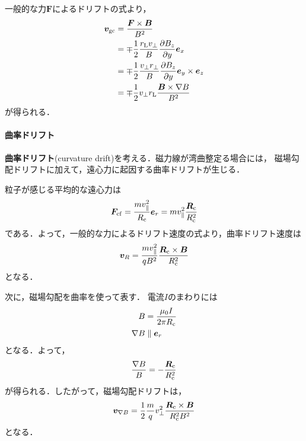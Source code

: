 \documentclass{report}
\begin{document}
          一般的な力$\bm{F}$によるドリフトの式より，
          \begin{align}
            \bm{v}_{\mathrm{gc}} &= \frac{\bm{F}\times\bm{B}}{B^2}\\
            &= \mp \frac{1}{2} \frac{r_{\mathrm{L}}v_{\perp}}{B} \pdv{B_z}{y}\bm{e}_x\\
            &= \mp \frac{1}{2} \frac{v_{\perp} r_{\perp}}{B} \pdv{B_z}{y}\bm{e}_y \times \bm{e}_z\\
            &= \mp \frac{1}{2} v_{\perp} r_{\mathrm{L}} \frac{\bm{B} \times \nabla B}{B^2}
          \end{align}
          が得られる．

        \paragraph{曲率ドリフト}
          \textbf{曲率ドリフト}(curvature drift)を考える．磁力線が湾曲整定る場合には，
          磁場勾配ドリフトに加えて，遠心力に起因する曲率ドリフトが生じる．

          粒子が感じる平均的な遠心力は
          \begin{align}
            \bm{F}_{\mathrm{cf}} = \frac{m v_{\parallel}^2}{R_{\mathrm{c}}}\bm{e}_r = m v_{\parallel}^2 \frac{\bm{R}_{\mathrm{c}}}{R_{\mathrm{c}}^2}
          \end{align}
          である．よって，一般的な力によるドリフト速度の式より，曲率ドリフト速度は
          \begin{align}
            \bm{v}_R = \frac{mv_{\parallel}^2}{qB^2}\frac{\bm{R}_{\mathrm{c}} \times \bm{B}}{R_{\mathrm{c}}^2}
          \end{align}
          となる．

          次に，磁場勾配を曲率を使って表す．
          電流$I$のまわりには
          \begin{align}
            B &= \frac{\mu_0 I}{2\pi R_{\mathrm{c}}}\\
            \nabla B &\parallel \bm{e}_r
          \end{align}
          となる．よって，
          \begin{align}
            \frac{\nabla B}{B} = -\frac{\bm{R}_{\mathrm{c}}}{R_{\mathrm{c}}^2}
          \end{align}
          が得られる．したがって，磁場勾配ドリフトは，
          \begin{align}
            \bm{v}_{\nabla B} = \frac{1}{2}\frac{m}{q}v_{\perp}^2 \frac{\bm{R}_{\mathrm{c}} \times \bm{B}}{R_{\mathrm{c}}^2 B^2}
          \end{align}
          となる．
\end{document}
